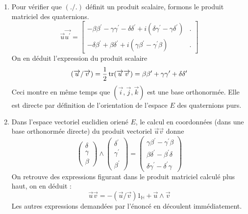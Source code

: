 \begin{enumerate}
 \item Pour vérifier que $(./.)$ définit un produit scalaire, formons le produit matriciel des quaternions.
\begin{displaymath}
 \overrightarrow{u}\overrightarrow{u^\prime} 
=
\begin{bmatrix}
-\beta \beta^\prime -\gamma \gamma^\prime -\delta \delta^\prime +i(\delta \gamma^\prime - \gamma \delta^\prime) & . \\
-\delta \beta^\prime + \beta \delta^\prime + i(\gamma \beta^\prime -\gamma^\prime \beta)  & .
\end{bmatrix}
\end{displaymath}
On en déduit l'expression du produit scalaire
\begin{displaymath}
 (\overrightarrow{u}/\overrightarrow{v}) = \dfrac{1}{2}\operatorname{tr} (\overrightarrow{u}\overrightarrow{v}) = 
\beta\beta^\prime + \gamma\gamma^\prime + \delta \delta^\prime
\end{displaymath}
Ceci montre en même temps que $(\overrightarrow{i}, \overrightarrow{j},\overrightarrow{k})$ est une base orthonormée. Elle est directe par définition de l'orientation de l'espace $E$ des quaternions purs.

\item Dans l'espace vectoriel euclidien oriené $E$, le calcul en coordonnées (dans une base orthonormée directe) du produit vectoriel $\overrightarrow{u}\overrightarrow{v}$ donne
\begin{displaymath}
 \begin{pmatrix}
  \delta \\
  \gamma \\
 \beta
 \end{pmatrix}
\wedge
 \begin{pmatrix}
  \delta^\prime \\
  \gamma^\prime \\
 \beta^\prime
 \end{pmatrix}
=
 \begin{pmatrix}
  \gamma \beta^\prime -\gamma^\prime \beta \\
  \beta \delta^\prime - \beta^\prime \delta \\
 \delta \gamma^\prime - \delta^\prime \gamma
 \end{pmatrix}
\end{displaymath}
On retrouve des expressions figurant dans le produit matriciel calculé plus haut, on en déduit :
\begin{displaymath}
\overrightarrow{u} \overrightarrow{v} = 
-(\overrightarrow{u}/\overrightarrow{v})1_{\mathbb H} + \overrightarrow{u} \wedge \overrightarrow{v}
\end{displaymath}
Les autres expressions demandées par l'énoncé en découlent immédiatement.
\end{enumerate}

